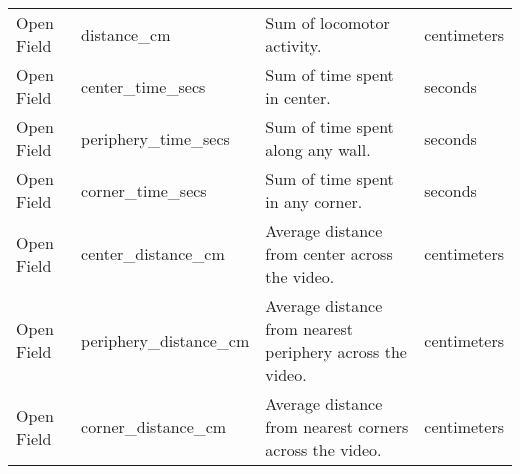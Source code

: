 \documentclass[11pt,reqno]{amsart}
\begin{document}
\begin{longtable}[c]{|p{0.15\linewidth}|p{0.23\linewidth}|p{0.45\linewidth}|p{0.18\linewidth}|}
 Open Field  & distance\_cm             & Sum of locomotor activity.                                                                                                                                                                                                                                                              & centimeters         \\[.3cm]
Open Field  & center\_time\_secs       & Sum of time spent in center.                                                                                                                                                                                                                                                            & seconds             \\[.3cm]
Open Field  & periphery\_time\_secs    & Sum of time spent along any wall.                                                                                                                                                                                                                                                       & seconds             \\[.3cm]
Open Field  & corner\_time\_secs       & Sum of time spent in any corner.                                                                                                                                                                                                                                                        & seconds             \\[.3cm]
Open Field & center\_distance\_cm     & Average distance from center across the video.                                                                                                                                                                                                                                          & centimeters         \\[.3cm]
Open Field & periphery\_distance\_cm  & Average distance from nearest periphery across the video.                                                                                                                                                                                                                               & centimeters         \\[.3cm]
Open Field & corner\_distance\_cm     & Average distance from nearest corners across the video.                                                                                                                                                                                                                                 & centimeters         \\[.3cm]

\end{longtable}
\end{document}
